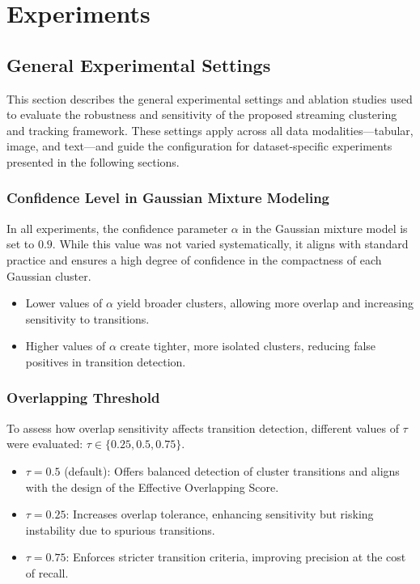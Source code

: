 \chapter{Experiments}\label{ch:experiments}

\section{General Experimental Settings}\label{sec:general_settings}

This section describes the general experimental settings and ablation studies
used to evaluate the robustness and sensitivity of the proposed streaming
clustering and tracking framework. These settings apply across all data
modalities—tabular, image, and text—and guide the configuration for
dataset-specific experiments presented in the following sections.

\subsection{Confidence Level in Gaussian Mixture Modeling}

In all experiments, the confidence parameter $\alpha$ in the Gaussian mixture
model is set to $0.9$. While this value was not varied systematically, it
aligns with standard practice and ensures a high degree of confidence in the
compactness of each Gaussian cluster.

\begin{itemize}
    \item Lower values of $\alpha$ yield broader clusters, allowing more overlap and
          increasing sensitivity to transitions.
    \item Higher values of $\alpha$ create tighter, more isolated clusters, reducing
          false positives in transition detection.
\end{itemize}

\subsection{Overlapping Threshold}

To assess how overlap sensitivity affects transition detection, different
values of $\tau$ were evaluated: $\tau \in \{0.25, 0.5, 0.75\}$.

\begin{itemize}
    \item $\tau = 0.5$ (default): Offers balanced detection of cluster
          transitions and aligns with the design of the Effective Overlapping
          Score.
    \item $\tau = 0.25$: Increases overlap tolerance, enhancing sensitivity
          but risking instability due to spurious transitions.
    \item $\tau = 0.75$: Enforces stricter transition criteria, improving
          precision at the cost of recall.
\end{itemize}

